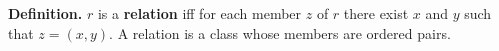 \textbf{Definition.} $r$ is a \textbf{relation} iff for each member $z$ of $r$ there exist $x$ and $y$ such that $z = (x,y)$. A relation is a class whose members are ordered pairs.
